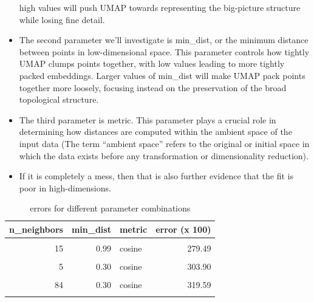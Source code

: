\documentclass[
  12pt]{article}
\begin{document}
\begin{itemize}
  high values will push UMAP towards representing the big-picture
  structure while losing fine detail.
\item
  The second parameter we'll investigate is min\_dist, or the minimum
  distance between points in low-dimensional space. This parameter
  controls how tightly UMAP clumps points together, with low values
  leading to more tightly packed embeddings. Larger values of min\_dist
  will make UMAP pack points together more loosely, focusing instead on
  the preservation of the broad topological structure.
\item
  The third parameter is metric. This parameter plays a crucial role in
  determining how distances are computed within the ambient space of the
  input data (The term ``ambient space'' refers to the original or
  initial space in which the data exists before any transformation or
  dimensionality reduction).
\item
  If it is completely a mess, then that is also further evidence that
  the fit is poor in high-dimensions.
\end{itemize}

\begin{table}[H]

\caption{errors for different parameter combinations}
\centering
\begin{tabular}[t]{r|r|l|r}
\hline
\textbf{n\_neighbors} & \textbf{min\_dist} & \textbf{metric} & \textbf{error (x 100)}\\
\hline
\cellcolor{gray!6}{5} & \cellcolor{gray!6}{0.99} & \cellcolor{gray!6}{cosine} & \cellcolor{gray!6}{262.18}\\
\hline
15 & 0.99 & cosine & 279.49\\
\hline
\cellcolor{gray!6}{84} & \cellcolor{gray!6}{0.99} & \cellcolor{gray!6}{cosine} & \cellcolor{gray!6}{295.64}\\
\hline
5 & 0.30 & cosine & 303.90\\
\hline
\cellcolor{gray!6}{15} & \cellcolor{gray!6}{0.30} & \cellcolor{gray!6}{cosine} & \cellcolor{gray!6}{308.97}\\
\hline
84 & 0.30 & cosine & 319.59\\
\hline
\textcolor{red}{\textbf{\cellcolor{gray!6}{30}}} & \textcolor{red}{\textbf{\cellcolor{gray!6}{0.30}}} & \textcolor{red}{\textbf{\cellcolor{gray!6}{cosine}}} & \textcolor{red}{\textbf{\cellcolor{gray!6}{386.35}}}\\
\hline
\end{tabular}
\end{table}
\end{document}
